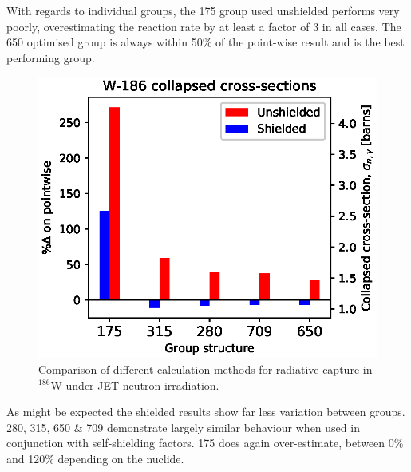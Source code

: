 With regards to individual groups, the 175 group used unshielded performs very poorly, overestimating the reaction rate by at least a factor of 3 in all cases. The 650 optimised group is always within 50\% of the point-wise result and is the best performing group.

\begin{figure}[H]
  \centering
  \includegraphics[width=\linewidth]{W-186.eps}
  \caption{Comparison of different calculation methods for radiative capture in $^{186}$W under JET neutron irradiation.}
  \label{fig:tungsten-186}
\end{figure}

As might be expected the shielded results show far less variation between groups. 280, 315, 650 \& 709 demonstrate largely similar behaviour when used in conjunction with self-shielding factors. 175 does again over-estimate, between 0\% and 120\% depending on the nuclide.

